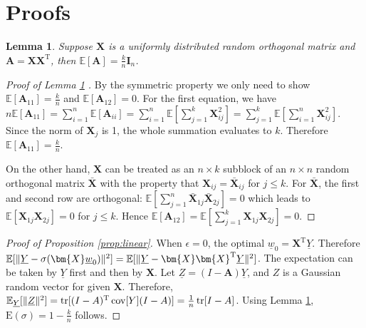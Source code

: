 \documentclass[conference]{IEEEtran}
\newtheorem{lemma}{Lemma}
\DeclarePairedDelimiter\norm{\lVert}{\rVert}
\def\E{\mathbb{E}}
\def\T{\mathrm{T}}
\DeclareMathOperator*{\Tr}{tr}
\DeclareMathOperator*{\Cov}{cov}
\begin{document}
\section{Proofs}\label{sec:Proofs}
\begin{lemma}\label{lem:A}
	Suppose $\bm{X}$ is a uniformly distributed random orthogonal matrix and $\bm{A} = \bm{X}\bm{X}^\T$,
	then $\E[\bm{A}] = \frac{k}{n} \mathbf{I}_n$.
\end{lemma}
\begin{proof}[Proof of Lemma \ref{lem:A} ]
By the symmetric property we only need to show $\E[\bm{A}_{11}] = \frac{k}{n}$ and
$\E[\bm{A}_{12}] = 0$. For the first equation, we have $n\E[\bm{A}_{11}]
= \sum_{i=1}^n \E[\bm{A}_{ii}] = \sum_{i=1}^n \E[ \sum_{j=1}^k \bm{X}^2_{ij}] =
\sum_{j=1}^k \E[\sum_{i=1}^n \bm{X}^2_{ij}]$. Since the norm of $\bm{X}_j$ is 1,
the whole summation evaluates to $k$. Therefore $\E[\bm{A}_{11}] = \frac{k}{n}$.

On the other hand, $\bm{X}$ can be treated as an $n\times k$ subblock of an $n\times n$
random orthogonal matrix $\bm{\bar{X}}$ with the property that $\bm{X}_{ij} = \bm{\bar{X}}_{ij}$
for $j\leq k$. For $\bm{\bar{X}}$, the first and second row are orthogonal:
 $\E[\sum_{j=1}^n \bm{\bar{X}}_{1j}\bm{\bar{X}}_{2j}] = 0 $ which leads to
 $\E[\bm{X}_{1j}\bm{X}_{2j}] = 0$ for $j \leq k$. Hence $\E[\bm{A}_{12}]=
 \E[\sum_{j=1}^k \bm{X}_{1j}\bm{X}_{2j}]=0$.
\end{proof}
\begin{proof}[Proof of Proposition \ref{prop:linear}]
    When $\epsilon = 0$, the optimal $\underline{w}_0 = \bm{X}^\T\underline{Y}$. Therefore
    $\E[\norm{\underline{Y} - \sigma(\bm{X} \underline{w}_0)}^2] = \E[\norm{\underline{Y}-\bm{X}\bm{X}^\T\underline{Y}}^2]$.
    The expectation can be taken by $\underline{Y}$ first and then by $\bm{X}$.
    Let $\underline{Z} = (I-\bm{A}) \underline{Y}$, and $Z$ is a Gaussian random vector
    for given $\bm{X}$. Therefore, $\E_{\underline{Y}}[\norm{\underline{Z}}^2] = \Tr[(I-A)^\T\Cov[Y](I-A)]
    = \frac{1}{n}\Tr[I - A]$. Using Lemma \ref{lem:A}, $\mathrm{E}(\sigma) = 1 - \frac{k}{n}$ follows.
\end{proof}
\end{document}
